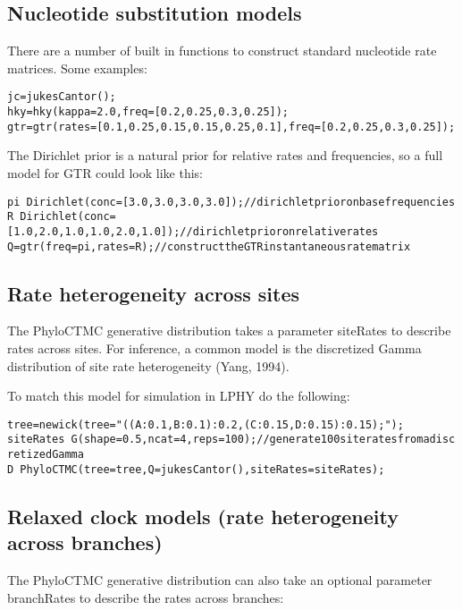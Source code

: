 \documentclass[10pt,letterpaper,table]{article}
\begin{document}
{\subsection*{ Nucleotide substitution models}

There are a number of built in functions to construct standard nucleotide rate matrices. Some examples:

\begin{alltt}
  jc = jukesCantor();
  hky = hky(kappa=2.0, freq=[0.2, 0.25, 0.3, 0.25]);
  gtr = gtr(rates=[0.1, 0.25, 0.15, 0.15, 0.25, 0.1], freq=[0.2, 0.25, 0.3, 0.25]);
\end{alltt}

The Dirichlet prior is a natural prior for relative rates and frequencies, so a full model for GTR could
look like this:

\begin{alltt}
  pi ~ Dirichlet(conc=[3.0,3.0,3.0,3.0]); // dirichlet prior on base frequencies
  R ~ Dirichlet(conc=[1.0, 2.0, 1.0, 1.0, 2.0, 1.0]); // dirichlet prior on relative rates
  Q = gtr(freq=pi, rates=R); // construct the GTR instantaneous rate matrix
\end{alltt}

\subsection*{ Rate heterogeneity across sites}

The PhyloCTMC generative distribution takes a parameter siteRates to describe rates across sites.
For inference, a common model is the discretized Gamma distribution of site rate heterogeneity (Yang, 1994).

To match this model for simulation in LPHY do the following:

\begin{alltt}
  tree = newick(tree="((A:0.1,B:0.1):0.2,(C:0.15,D:0.15):0.15);");
  siteRates ~ G(shape=0.5, ncat=4, reps=100); // generate 100 site rates from a discretized Gamma
  D ~ PhyloCTMC(tree=tree, Q=jukesCantor(), siteRates=siteRates);
\end{alltt}

\subsection*{  Relaxed clock models (rate heterogeneity across branches) }

The PhyloCTMC generative distribution can also take an optional parameter branchRates to describe the
rates across branches:

}
\end{document}
